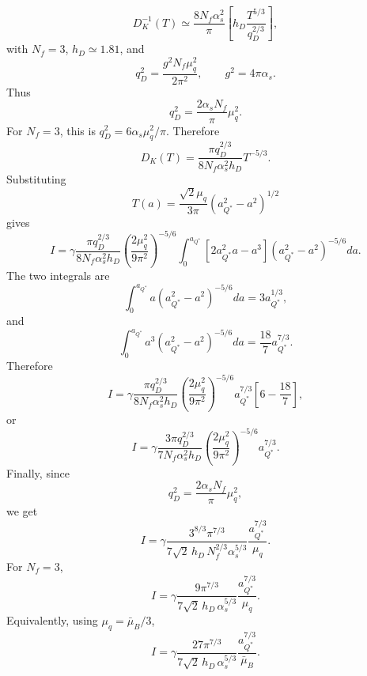 \documentclass[11pt]{article}
\begin{document}
\begin{equation}
D_K^{-1}(T)
\simeq 
\frac{8N_f\alpha_s^2}{\pi}
\left[
h_D\frac{T^{5/3}}{q_D^{2/3}}
\right],
\end{equation}
with \(N_f=3\), \(h_D\simeq1.81\), and
\begin{equation}
q_D^2=\frac{g^2N_f\mu_q^2}{2\pi^2},
\qquad
g^2=4\pi\alpha_s.
\end{equation}
Thus
\begin{equation}
q_D^2=\frac{2\alpha_sN_f}{\pi}\mu_q^2 .
\end{equation}
For \(N_f=3\), this is \(q_D^2=6\alpha_s\mu_q^2/\pi\).
Therefore
\begin{equation}
D_K(T)
=
\frac{\pi q_D^{2/3}}{8N_f\alpha_s^2h_D}
T^{-5/3}.
\end{equation}
Substituting
\begin{equation}
T(a)=
\frac{\sqrt{2}\mu_q}{3\pi}
\left(a_{Q^*}^2-a^2\right)^{1/2}
\end{equation}
gives
\begin{equation}
I
=
\gamma
\frac{\pi q_D^{2/3}}{8N_f\alpha_s^2h_D}
\left(\frac{2\mu_q^2}{9\pi^2}\right)^{-5/6}
\int_0^{a_{Q^*}}
\left[
2a_{Q^*}^2a-a^3
\right]
\left(a_{Q^*}^2-a^2\right)^{-5/6}da .
\end{equation}
The two integrals are
\begin{equation}
\int_0^{a_{Q^*}}a
\left(a_{Q^*}^2-a^2\right)^{-5/6}da
=
3a_{Q^*}^{1/3},
\end{equation}
and
\begin{equation}
\int_0^{a_{Q^*}}a^3
\left(a_{Q^*}^2-a^2\right)^{-5/6}da
=
\frac{18}{7}a_{Q^*}^{7/3}.
\end{equation}
Therefore
\begin{equation}
I
=
\gamma
\frac{\pi q_D^{2/3}}{8N_f\alpha_s^2h_D}
\left(\frac{2\mu_q^2}{9\pi^2}\right)^{-5/6}
a_{Q^*}^{7/3}
\left[
6-\frac{18}{7}
\right],
\end{equation}
or
\begin{equation}
I
=
\gamma
\frac{3\pi q_D^{2/3}}{7N_f\alpha_s^2h_D}
\left(\frac{2\mu_q^2}{9\pi^2}\right)^{-5/6}
a_{Q^*}^{7/3}.
\end{equation}
Finally, since
\begin{equation}
q_D^2=\frac{2\alpha_sN_f}{\pi}\mu_q^2,
\end{equation}
we get
\begin{equation}
I
=
\gamma
\frac{
3^{8/3}\pi^{7/3}
}{
7\sqrt{2}\,h_D\,N_f^{2/3}\alpha_s^{5/3}
}
\frac{a_{Q^*}^{7/3}}{\mu_q}.
\end{equation}
For \(N_f=3\),
\begin{equation}
I
=
\gamma
\frac{
9\pi^{7/3}
}{
7\sqrt{2}\,h_D\,\alpha_s^{5/3}
}
\frac{a_{Q^*}^{7/3}}{\mu_q}.
\end{equation}
Equivalently, using \(\mu_q=\bar\mu_B/3\),
\begin{equation}
I
=
\gamma
\frac{
27\pi^{7/3}
}{
7\sqrt{2}\,h_D\,\alpha_s^{5/3}
}
\frac{a_{Q^*}^{7/3}}{\bar\mu_B}.
\end{equation}
\end{document}
